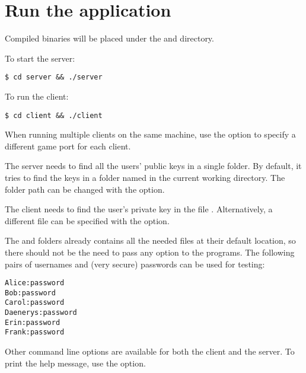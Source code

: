 \section{Run the application}\label{appendix:howtorun}

Compiled binaries will be placed under the  and 
directory.

To start the server:
\begin{verbatim}
$ cd server && ./server
\end{verbatim}

To run the client:
\begin{verbatim}
$ cd client && ./client
\end{verbatim}

When running multiple clients on the same machine, use the  option to
specify a different game port for each client.

The server needs to find all the users' public keys in a single folder. By
default, it tries to find the keys in a folder named  in the current
working directory. The folder path can be changed with the  option.

The client needs to find the user's private key in the file
. Alternatively, a different file can be specified with the
 option.

The  and  folders already contains all the needed
files at their default location, so there should not be the need to pass any
option to the programs. The following pairs of usernames and (very secure)
passwords can be used for testing:
\begin{verbatim}
Alice:password
Bob:password
Carol:password
Daenerys:password
Erin:password
Frank:password
\end{verbatim}

Other command line options are available for both the client and the server. To
print the help message, use the  option.
